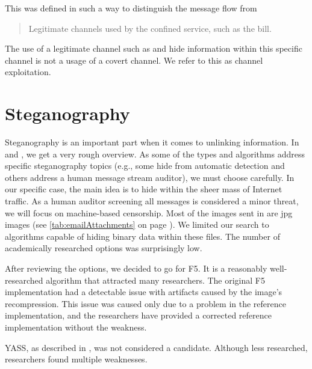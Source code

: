 This was defined  in such a way to distinguish the message flow from 

\begin{quote}
	Legitimate channels used by the confined service, such as the bill.
\end{quote}

The use of a legitimate channel such as  and hide information within this specific channel is not a usage of a covert channel. We refer to this as channel exploitation.

\section{Steganography}
Steganography is an important part when it comes to unlinking information. In \cite{6828087} and \cite{subhedar2014current}, we get a very rough overview. As some of the types and algorithms address specific steganography topics (e.g., some hide from automatic detection and others address a human message stream auditor), we must choose carefully. In our specific case, the main idea is to hide within the sheer mass of Internet traffic. As a human auditor screening all messages is considered a minor threat, we will focus on machine-based censorship. Most of the images sent in  are jpg images (see \cref{tab:emailAttachments} on page \pageref{tab:emailAttachments}). We limited our search to algorithms capable of hiding binary data within these files. The number of academically researched options was surprisingly low.

After reviewing the options, we decided to go for F5\cite{f5}. It is a reasonably well-researched algorithm that attracted many researchers. The original F5 implementation had a detectable issue with artifacts\cite{F5broken} caused by the image's recompression. This issue was caused only due to a problem in the reference implementation, and the researchers have provided a corrected reference implementation without the weakness.


YASS, as described in \cite{solanki2007yass}, was not considered a candidate. Although less researched, researchers found multiple weakness\-es\cite{kodovsky2010modern,li2009steganalysis}.


